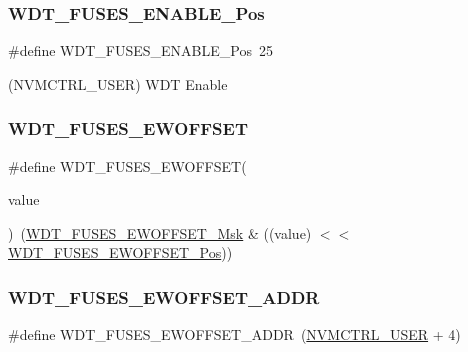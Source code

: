 \subsubsection{\texorpdfstring{WDT\_FUSES\_ENABLE\_Pos}{WDT\_FUSES\_ENABLE\_Pos}}
{\footnotesize\ttfamily \#define W\+D\+T\+\_\+\+F\+U\+S\+E\+S\+\_\+\+E\+N\+A\+B\+L\+E\+\_\+\+Pos~25}



(N\+V\+M\+C\+T\+R\+L\+\_\+\+U\+S\+ER) W\+DT Enable 

\mbox{\label{group__fuses__api_ga97578a46129ba8e2a78d9c2d7e15186e}} 
\subsubsection{\texorpdfstring{WDT\_FUSES\_EWOFFSET}{WDT\_FUSES\_EWOFFSET}}
{\footnotesize\ttfamily \#define W\+D\+T\+\_\+\+F\+U\+S\+E\+S\+\_\+\+E\+W\+O\+F\+F\+S\+ET(\begin{DoxyParamCaption}\item[{}]{value }\end{DoxyParamCaption})~(\mbox{\hyperlink{group__fuses__api_ga7acf63462b40241031a53d6ecf5a0d69}{W\+D\+T\+\_\+\+F\+U\+S\+E\+S\+\_\+\+E\+W\+O\+F\+F\+S\+E\+T\+\_\+\+Msk}} \& ((value) $<$$<$ \mbox{\hyperlink{group__fuses__api_gae2f89f15eabc293811402651af74d059}{W\+D\+T\+\_\+\+F\+U\+S\+E\+S\+\_\+\+E\+W\+O\+F\+F\+S\+E\+T\+\_\+\+Pos}}))}

\mbox{\label{group__fuses__api_ga04fb0607afaf725d76bd4205ea0d4f94}} 
\subsubsection{\texorpdfstring{WDT\_FUSES\_EWOFFSET\_ADDR}{WDT\_FUSES\_EWOFFSET\_ADDR}}
{\footnotesize\ttfamily \#define W\+D\+T\+\_\+\+F\+U\+S\+E\+S\+\_\+\+E\+W\+O\+F\+F\+S\+E\+T\+\_\+\+A\+D\+DR~(\mbox{\hyperlink{group___s_a_m_d21_j18_a__base_ga7a7a83a5753fa323b61536e396083c99}{N\+V\+M\+C\+T\+R\+L\+\_\+\+U\+S\+ER}} + 4)}

